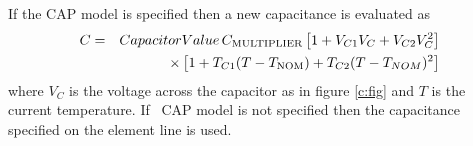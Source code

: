 If the CAP model is specified then a new capacitance is evaluated
as
\begin{eqnarray}
C & = &CapacitorValue\,C_{\mbox{\scriptsize MULTIPLIER}}
  \left[ 1 + V_{C1} V_C + V_{C2} V_C^2 \right] \\
  && \times\left[ 1 + T_{C1} (T-T_{\mbox{\scriptsize NOM}}) + T_{C2} (T-T_{NOM})^2 \right]
\end{eqnarray}
where $V_C$ is the voltage across the capacitor as in figure \ref{c:fig} and
$T$ is the current temperature.
If \pspice\ CAP model is not specified then the capacitance specified on the element line is used.
